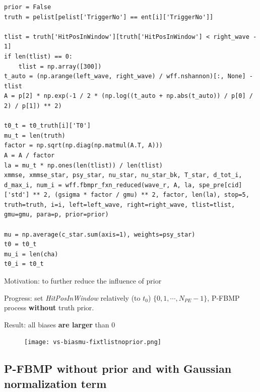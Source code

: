 \documentclass[notitlepage]{article}
\begin{document}
\begin{lstlisting}
prior = False
truth = pelist[pelist['TriggerNo'] == ent[i]['TriggerNo']]

tlist = truth['HitPosInWindow'][truth['HitPosInWindow'] < right_wave - 1]
if len(tlist) == 0:
    tlist = np.array([300])
t_auto = (np.arange(left_wave, right_wave) / wff.nshannon)[:, None] - tlist
A = p[2] * np.exp(-1 / 2 * (np.log((t_auto + np.abs(t_auto)) / p[0] / 2) / p[1]) ** 2)

t0_t = t0_truth[i]['T0']
mu_t = len(truth)
factor = np.sqrt(np.diag(np.matmul(A.T, A)))
A = A / factor
la = mu_t * np.ones(len(tlist)) / len(tlist)
xmmse, xmmse_star, psy_star, nu_star, nu_star_bk, T_star, d_tot_i, d_max_i, num_i = wff.fbmpr_fxn_reduced(wave_r, A, la, spe_pre[cid]['std'] ** 2, (gsigma * factor / gmu) ** 2, factor, len(la), stop=5, truth=truth, i=i, left=left_wave, right=right_wave, tlist=tlist, gmu=gmu, para=p, prior=prior)

mu = np.average(c_star.sum(axis=1), weights=psy_star)
t0 = t0_t
mu_i = len(cha)
t0_i = t0_t
\end{lstlisting}

Motivation: to further reduce the influence of prior

Progress: set \textit{HitPosInWindow} relatively (to $t_0$) $\{0,1,\cdots,N_{PE}-1\}$, P-FBMP process \textbf{without} truth prior. 

Result: all biases \textbf{are larger} than 0

\begin{figure}[H]
    \centering
    \texttt{[image: vs-biasmu-fixtlistnoprior.png]}
\end{figure}

\subsection{P-FBMP \textbf{without} prior and \textbf{with} Gaussian normalization term}
\end{document}
